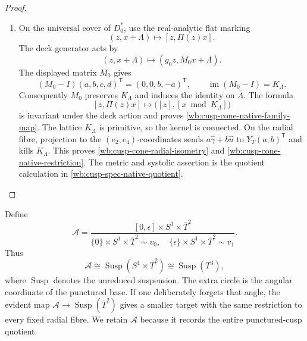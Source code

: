 \begin{proof}
\begin{enumerate}[label=\arabic*.,leftmargin=*]
\item On the universal cover of \(D_0^*\), use the real-analytic flat marking
\[
 (z,x+\Lambda)\longmapsto[z,\Pi(z)x].
\]
The deck generator acts by
\[
 (z,x+\Lambda)\longmapsto(g_0z,M_0x+\Lambda).
\]
The displayed matrix \(M_0\) gives
\begin{equation}
 (M_0-I)(a,b,c,d)^{\mathsf T}=(0,0,b,-a)^{\mathsf T},\qquad
 \operatorname{im}(M_0-I)=K_\Lambda.
 \label{wb:cusp-cone-monodromy-image}
\end{equation}
Consequently \(M_0\) preserves \(K_\Lambda\) and induces the identity on
\(\overline\Lambda\).  The formula
\[
 [z,\Pi(z)x]\longmapsto
 \bigl([z],[x\bmod K_\Lambda]\bigr)
\]
is invariant under the deck action and proves
\cref{wb:cusp-cone-native-family-map}.  The lattice \(K_\Lambda\) is primitive,
so the kernel is connected.  On the radial fibre, projection to the
\((e_2,e_4)\)-coordinates sends
\(a\widehat\gamma+b\widehat u\) to \(Y_T(a,b)^{\mathsf T}\) and kills
\(K_\Lambda\).  This proves
\cref{wb:cusp-cone-radial-isometry} and \cref{wb:cusp-cone-native-restriction}.  The metric
and systolic assertion is the quotient calculation in
\cref{wb:cusp-spec-native-quotient}.
\end{enumerate}
\end{proof}

Define
\begin{equation}
 \mathcal A=
 \frac{[0,\epsilon]\times S^1\times\overline T^2}
 {\{0\}\times S^1\times\overline T^2\sim v_0,\quad
  \{\epsilon\}\times S^1\times\overline T^2\sim v_1}.
 \label{wb:cusp-cone-A-definition}
\end{equation}
Thus
\begin{equation}
 \mathcal A\cong
 \operatorname{Susp}(S^1\times\overline T^2)
 \cong\operatorname{Susp}(T^3),
 \label{wb:cusp-cone-A-suspension}
\end{equation}
where \(\operatorname{Susp}\) denotes the unreduced suspension.  The extra
circle is the angular coordinate of the punctured base.  If one deliberately
forgets that angle, the evident map
\(\mathcal A\to\operatorname{Susp}(\overline T^2)\) gives a smaller target
with the same restriction to every fixed radial fibre.  We retain
\(\mathcal A\) because it records the entire punctured-cusp quotient.

